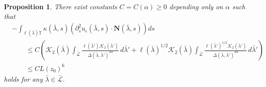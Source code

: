 \documentclass[reqno,centertags,12pt]{amsart}
\newtheorem{proposition}[theorem]{Proposition}
\theoremstyle{definition}
\numberwithin{equation}{section}
\newcommand{\bbT}{{\mathbb{T}}}
\begin{document}
\begin{proposition}
    There exist constants $C=C(\alpha)\geq 0$ depending only on $\alpha$ such that
    \begin{align*}
        &-\int_{\ell(\bar{\lambda})\bbT}
        \kappa(\bar{\lambda},s)
        \left(
            \partial_{s}^{2}u_{\epsilon}(\bar{\lambda},s)
            \cdot \mathbf{N}(\bar{\lambda},s)
        \right)
        ds
        \\&\quad\quad \leq
        C\left(
            \mathcal{K}_{2}(\bar{\lambda})
            \int_{\bar{\mathcal{L}}}
            \frac{\ell(\bar{\lambda}')\mathcal{K}_{2}(\bar{\lambda}')}
            {\Delta(\bar{\lambda},\bar{\lambda}')^{2\alpha}}
            \,d\bar{\lambda}'
            + \ell(\bar{\lambda})^{1/2}\mathcal{K}_{2}(\bar{\lambda})
            \int_{\bar{\mathcal{L}}}
            \frac{\ell(\bar{\lambda}')^{1/2}\mathcal{K}_{2}(\bar{\lambda}')}
            {\Delta(\bar{\lambda},\bar{\lambda}')^{2\alpha}}
            \,d\bar{\lambda}'
        \right) \\
        &\quad\quad\leq CL(z_{0})^{6}
    \end{align*}
    holds for any $\bar{\lambda}\in\bar{\mathcal{L}}$.
\end{proposition}
\end{document}
